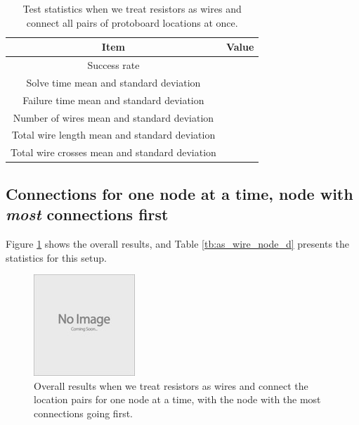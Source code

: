 \begin{table}[H]
\begin{center}
\begin{singlespace}
\begin{tabular}{| c | c |}
\hline
Item & Value \\
\hline\hline
Success rate & \\
Solve time mean and standard deviation & \\
Failure time mean and standard deviation & \\
Number of wires mean and standard deviation & \\
Total wire length mean and standard deviation & \\
Total wire crosses mean and standard deviation & \\
\hline
\end{tabular}
\end{singlespace}
\end{center}
\label{tb:as_wire_all}
\caption{Test statistics when we treat resistors as wires and connect all
pairs of protoboard locations at once.}
\end{table}

\subsection{Connections for one node at a time, node with \textit{most}
connections first}

Figure \ref{fig:as_wire_node_d} shows the overall results, and Table
\ref{tb:as_wire_node_d} presents the statistics for this setup.

\begin{figure}[H]
\begin{center}
\includegraphics{Images/placeholder.jpg}
\caption{Overall results when we treat resistors as wires and connect the
location pairs for one node at a time, with the node with the most connections
going first.}
\label{fig:as_wire_node_d}
\end{center}
\end{figure}

